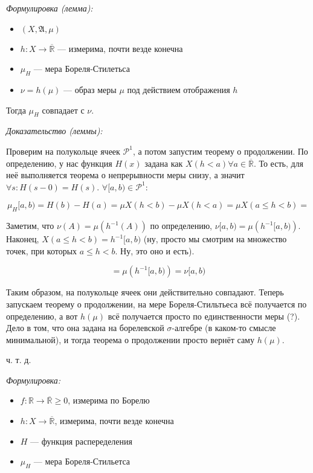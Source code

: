 \documentclass{article}
\def\rinf{\overline{\mathbb{R}}}
\begin{document}
\textit{Формулировка (лемма):}

\begin{itemize}
    \item $(X, \mathfrak{A}, \mu)$
    \item $h: X \rightarrow \rinf$ --- измерима, почти везде конечна
    \item $\mu_H$ --- мера Бореля-Стилетьса
    \item $\nu = h(\mu)$ --- образ меры $\mu$ под действием отображения $h$
\end{itemize}

Тогда $\mu_H$ совпадает с $\nu$.

\textit{Доказательство (леммы):}

Проверим на полукольце ячеек $\mathcal{P}^1$, а потом запустим теорему о продолжении. По определению, у нас функция $H(x)$ задана как $X(h < a) \forall a \in \rinf$. То есть, для неё выполняется теорема о непрерывности меры снизу, а значит $\forall s: H(s - 0) = H(s)$. $\forall [a, b) \in \mathcal{P}^1$:

\[\mu_H[a, b) = H(b) - H(a) = \mu X(h < b) - \mu X(h < a) = \mu X(a \le h < b) = \]

Заметим, что $\nu(A) = \mu(h^{-1}(A))$ по определению, $\nu [a, b) = \mu\left(h^{-1} [a, b)\right)$. Наконец, $X(a \le h < b) = h^{-1}[a, b)$ (ну, просто мы смотрим на множество точек, при которых $a \le h < b$. Ну, это оно и есть).

\[ = \mu\left(h^{-1} [a, b)\right) = \nu [a, b)\]

Таким образом, на полукольце ячеек они действительно совпадают. Теперь запускаем теорему о продолжении, на мере Бореля-Стильтьеса всё получается по определению, а вот $h(\mu)$ всё получается просто по единственности меры (?). Дело в том, что она задана на борелевской $\sigma$-алгебре (в каком-то смысле минимальной), и тогда теорема о продолжении просто вернёт саму $h(\mu)$.

ч. т. д. 

\textit{Формулировка:}

\begin{itemize}
    \item $f: \mathbb{R} \rightarrow \rinf \ge 0$, измерима по Борелю
    \item $h: X \rightarrow \rinf$, измерима, почти везде конечна
    \item $H$ --- функция распеределения
    \item $\mu_{H}$ --- мера Бореля-Стильетса
\end{itemize}
\end{document}
